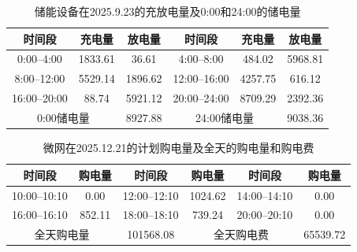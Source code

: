 \documentclass[UTF8]{ctexart}
\begin{document}
    \begin{table}[htbp]
        \centering
        \caption{储能设备在2025.9.23的充放电量及0:00和24:00的储电量}
        \label{tab:q2_battery_0923}
        \begin{tabular}{cccccc}
            \toprule
            时间段 & 充电量 & 放电量 & 时间段 & 充电量 & 放电量 \\
            \midrule
            0:00--4:00   & 1833.61 & 36.61 &
            4:00--8:00   & 484.02 & 5968.81 \\
            8:00--12:00  & 5529.14 & 1896.62 &
            12:00--16:00 & 4257.75 & 616.12 \\
            16:00--20:00 & 88.74 & 5921.12 &
            20:00--24:00 & 8709.29 & 2392.36 \\
            \midrule
            \multicolumn{2}{c}{0:00储电量} & 8927.88 &
            \multicolumn{2}{c}{24:00储电量} & 9038.36 \\
            \bottomrule
        \end{tabular}
    \end{table}
    
    \begin{table}[htbp]
        \centering
        \caption{微网在2025.12.21的计划购电量及全天的购电量和购电费}
        \label{tab:q2_tenminute_1221}
        \begin{tabular}{cccccc}
            \toprule
            时间段 & 购电量 & 时间段 & 购电量 & 时间段 & 购电量 \\
            \midrule
            10:00--10:10 & 0.00 &
            12:00--12:10 & 1024.62 &
            14:00--14:10 & 0.00 \\
            16:00--16:10 & 852.11 &
            18:00--18:10 & 739.24 &
            20:00--20:10 & 0.00 \\
            \midrule
            \multicolumn{2}{c}{全天购电量} & 101568.08 &
            \multicolumn{2}{c}{全天购电费} & 65539.72 \\
            \bottomrule
        \end{tabular}
    \end{table}
    
\end{document}
